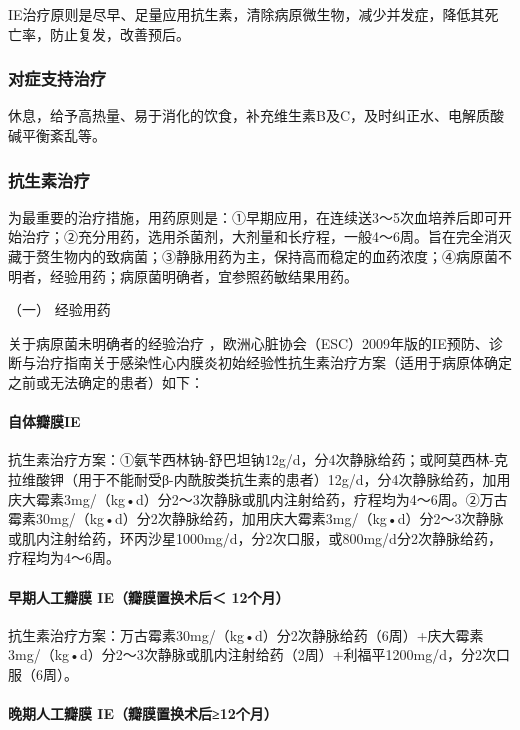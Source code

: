 IE治疗原则是尽早、足量应用抗生素，清除病原微生物，减少并发症，降低其死亡率，防止复发，改善预后。

\subsubsection{对症支持治疗}

休息，给予高热量、易于消化的饮食，补充维生素B及C，及时纠正水、电解质酸碱平衡紊乱等。

\subsubsection{抗生素治疗}

为最重要的治疗措施，用药原则是：①早期应用，在连续送3～5次血培养后即可开始治疗；②充分用药，选用杀菌剂，大剂量和长疗程，一般4～6周。旨在完全消灭藏于赘生物内的致病菌；③静脉用药为主，保持高而稳定的血药浓度；④病原菌不明者，经验用药；病原菌明确者，宜参照药敏结果用药。

\hypertarget{text00300.htmlux5cux23CHP10-3-3-2-1}{}
（一） 经验用药

关于病原菌未明确者的经验治疗
，欧洲心脏协会（ESC）2009年版的IE预防、诊断与治疗指南关于感染性心内膜炎初始经验性抗生素治疗方案（适用于病原体确定之前或无法确定的患者）如下：

\paragraph{自体瓣膜IE}

抗生素治疗方案：①氨苄西林钠-舒巴坦钠12g/d，分4次静脉给药；或阿莫西林-克拉维酸钾（用于不能耐受β-内酰胺类抗生素的患者）12g/d，分4次静脉给药，加用庆大霉素3mg/（kg•d）分2～3次静脉或肌内注射给药，疗程均为4～6周。②万古霉素30mg/（kg•d）分2次静脉给药，加用庆大霉素3mg/（kg•d）分2～3次静脉或肌内注射给药，环丙沙星1000mg/d，分2次口服，或800mg/d分2次静脉给药，疗程均为4～6周。

\paragraph{早期人工瓣膜 IE（瓣膜置换术后＜ 12个月）}

抗生素治疗方案：万古霉素30mg/（kg•d）分2次静脉给药（6周）+庆大霉素3mg/（kg•d）分2～3次静脉或肌内注射给药（2周）+利福平1200mg/d，分2次口服（6周）。

\paragraph{晚期人工瓣膜 IE（瓣膜置换术后≥12个月）}

